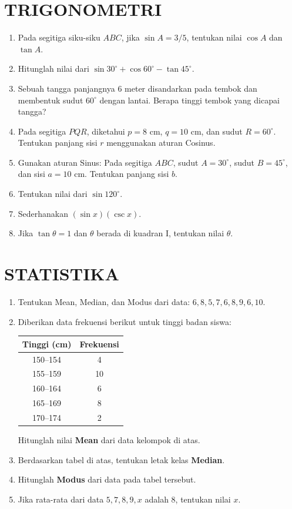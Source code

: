 \documentclass[12pt, a4paper]{article}
\begin{document}
\section{TRIGONOMETRI}
\begin{enumerate}
    \item Pada segitiga siku-siku $ABC$, jika $\sin A = 3/5$, tentukan nilai $\cos A$ dan $\tan A$.
    \item Hitunglah nilai dari $\sin 30^\circ + \cos 60^\circ - \tan 45^\circ$.
    \item Sebuah tangga panjangnya 6 meter disandarkan pada tembok dan membentuk sudut $60^\circ$ dengan lantai. Berapa tinggi tembok yang dicapai tangga?
    \item Pada segitiga $PQR$, diketahui $p = 8$ cm, $q = 10$ cm, dan sudut $R = 60^\circ$. Tentukan panjang sisi $r$ menggunakan aturan Cosinus.
    \item Gunakan aturan Sinus: Pada segitiga $ABC$, sudut $A = 30^\circ$, sudut $B = 45^\circ$, dan sisi $a = 10$ cm. Tentukan panjang sisi $b$.
    \item Tentukan nilai dari $\sin 120^\circ$.
    \item Sederhanakan $(\sin x)(\csc x)$.
    \item Jika $\tan \theta = 1$ dan $\theta$ berada di kuadran I, tentukan nilai $\theta$.
\end{enumerate}

\section{STATISTIKA}
\begin{enumerate}
    \item Tentukan Mean, Median, dan Modus dari data: $6, 8, 5, 7, 6, 8, 9, 6, 10$.
    \item Diberikan data frekuensi berikut untuk tinggi badan siswa:
    \begin{center}
    \begin{tabular}{|c|c|}
    \hline
    Tinggi (cm) & Frekuensi \\
    \hline
    150--154 & 4 \\
    155--159 & 10 \\
    160--164 & 6 \\
    165--169 & 8 \\
    170--174 & 2 \\
    \hline
    \end{tabular}
    \end{center}
    Hitunglah nilai \textbf{Mean} dari data kelompok di atas.
    \item Berdasarkan tabel di atas, tentukan letak kelas \textbf{Median}.
    \item Hitunglah \textbf{Modus} dari data pada tabel tersebut.
    \item Jika rata-rata dari data $5, 7, 8, 9, x$ adalah 8, tentukan nilai $x$.
\end{enumerate}
\end{document}
